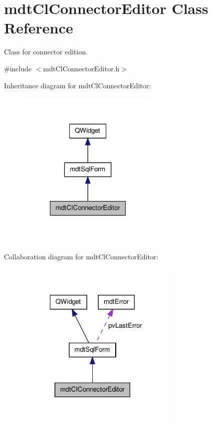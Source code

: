 \hypertarget{classmdt_cl_connector_editor}{\section{mdt\-Cl\-Connector\-Editor Class Reference}
\label{classmdt_cl_connector_editor}
}


Class for connector edition.  




{\ttfamily \#include $<$mdt\-Cl\-Connector\-Editor.\-h$>$}



Inheritance diagram for mdt\-Cl\-Connector\-Editor\-:\nopagebreak
\begin{figure}[H]
\begin{center}
\leavevmode
\includegraphics[width=192pt]{classmdt_cl_connector_editor__inherit__graph}
\end{center}
\end{figure}


Collaboration diagram for mdt\-Cl\-Connector\-Editor\-:\nopagebreak
\begin{figure}[H]
\begin{center}
\leavevmode
\includegraphics[width=218pt]{classmdt_cl_connector_editor__coll__graph}
\end{center}
\end{figure}

